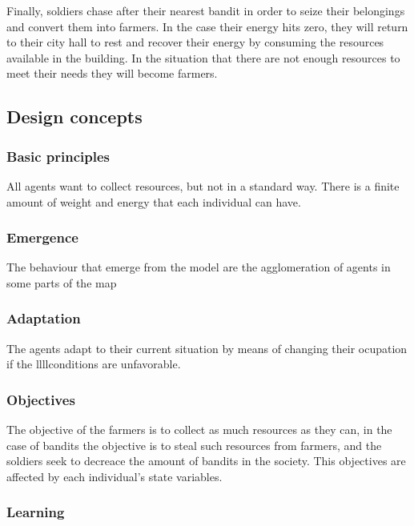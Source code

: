 \documentclass{wscpaperproc}
\theoremstyle{wsc}
\begin{document}
Finally, soldiers chase after their nearest bandit in order to seize their belongings and convert them
into farmers. In the case their energy hits zero, they will return to their city hall to rest and
recover their energy by consuming the resources available in the building. In the situation that
there are not enough resources to meet their needs they will become farmers.

\subsection{Design concepts}

\subsubsection{Basic principles}

All agents want to collect resources, but not in a standard way. There is a
finite amount of weight and energy that each individual can have.

\subsubsection{Emergence}

The behaviour that emerge from the model are the agglomeration of agents in
some parts of the map

\subsubsection{Adaptation}

The agents adapt to their current situation by means of changing their
ocupation if the llllconditions are unfavorable.

\subsubsection{Objectives}

The objective of the farmers is to collect as much resources as they can, in
the case of bandits the objective is to steal such resources from farmers, and
the soldiers seek to decreace the amount of bandits in the society. This
objectives are affected by each individual's state variables.

\subsubsection{Learning}
\end{document}
